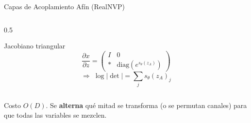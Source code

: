 \documentclass[aspectratio=169, 10pt]{beamer}
\begin{document}
\begin{frame}[shrink]{Capas de Acoplamiento Af\'in (RealNVP)}
\begin{columns}[T]
		\begin{column}{0.5\textwidth}
			\begin{block}{Jacobiano triangular}
				\small
				\[
				\frac{\partial x}{\partial z} =
				\begin{pmatrix} I & 0 \\ \ast & \mathrm{diag}(e^{s_\theta(z_A)}) \end{pmatrix}
				\]
				\[
				\Rightarrow\;\log|\det| = \textstyle\sum_j s_\theta(z_A)_j
				\]
			\end{block}
		\end{column}
	\end{columns}

	\vspace{0.1cm}

	\small Costo $O(D)$. Se \textbf{alterna} qu\'e mitad se transforma (o se permutan canales) para que todas las variables se mezclen.

\end{frame}
\end{document}
